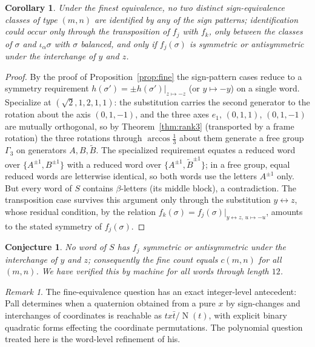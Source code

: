 \documentclass[11pt]{article}
\newtheorem{corollary}[theorem]{Corollary}
\newtheorem{conjecture}[theorem]{Conjecture}
\theoremstyle{definition}
\theoremstyle{remark}
\newtheorem{remark}[theorem]{Remark}
\newcommand{\ia}{\iota_\alpha}
\DeclareMathOperator{\N}{N}
\begin{document}
\begin{corollary}\label{cor:fine-complete}
Under the finest equivalence, no two distinct sign-equivalence classes of type $(m,n)$ are identified by any of the sign patterns; identification could occur only through the transposition of $f_j$ with $f_k$, only between the classes of $\sigma$ and $\ia\sigma$ with $\sigma$ balanced, and only if $f_j(\sigma)$ is symmetric or antisymmetric under the interchange of $y$ and $z$.
\end{corollary}

\begin{proof}
By the proof of Proposition~\ref{prop:fine} the sign-pattern cases reduce to a symmetry requirement $h(\sigma')=\pm h(\sigma')|_{z\mapsto-z}$ (or $y\mapsto-y$) on a single word. Specialize at $(\sqrt2,1,2,1,1)$: the substitution carries the second generator to the rotation about the axis $(0,1,-1)$, and the three axes $e_1$, $(0,1,1)$, $(0,1,-1)$ are mutually orthogonal, so by Theorem~\ref{thm:rank3} (transported by a frame rotation) the three rotations through $\arccos\frac13$ about them generate a free group $\Gamma_3$ on generators $A,B,\widetilde B$. The specialized requirement equates a reduced word over $\{A^{\pm1},B^{\pm1}\}$ with a reduced word over $\{A^{\pm1},\widetilde B^{\pm1}\}$; in a free group, equal reduced words are letterwise identical, so both words use the letters $A^{\pm1}$ only. But every word of $S$ contains $\beta$-letters (its middle block), a contradiction. The transposition case survives this argument only through the substitution $y\leftrightarrow z$, whose residual condition, by the relation $f_k(\sigma)=f_j(\sigma)|_{y\leftrightarrow z,\,u\mapsto-u}$, amounts to the stated symmetry of $f_j(\sigma)$.
\end{proof}

\begin{conjecture}\label{conj:exact}
No word of $S$ has $f_j$ symmetric or antisymmetric under the interchange of $y$ and $z$; consequently the fine count equals $c(m,n)$ for all $(m,n)$. We have verified this by machine for all words through length $12$.
\end{conjecture}

\begin{remark}
The fine-equivalence question has an exact integer-level antecedent: Pall \cite[Lemma 20, Theorem 8]{Pall} determines when a quaternion obtained from a pure $x$ by sign-changes and interchanges of coordinates is reachable as $tx\bar t/\N(t)$, with explicit binary quadratic forms effecting the coordinate permutations. The polynomial question treated here is the word-level refinement of his.
\end{remark}
\end{document}
